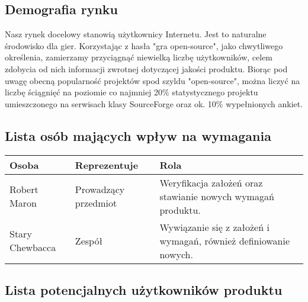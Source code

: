 \documentclass[12pt,a4paper,twoside]{article}
\begin{document}
\subsection{Demografia rynku}
Nasz rynek docelowy stanowią użytkownicy Internetu.
Jest to naturalne środowisko dla gier.
Korzystając z hasła "gra open-source", jako chwytliwego określenia, zamierzamy przyciągnąć niewielką liczbę użytkowników, celem zdobycia od nich informacji zwrotnej dotyczącej jakości produktu.
Biorąc pod uwagę obecną popularność projektów spod szyldu "open-source", można liczyć na liczbę ściągnięć na poziomie co najmniej 20\% statystycznego projektu umieszczonego na serwisach klasy SourceForge oraz ok. 10\% wypełnionych ankiet.






\subsection{Lista osób mających wpływ na wymagania}


\begin{longtable}{|p{1in}|p{2in}|p{2in}|}
\hline
{\bf Osoba} & {\bf Reprezentuje} & {\bf Rola}\\
\hline
\endhead
Robert Maron &
Prowadzący przedmiot &
Weryfikacja założeń oraz stawianie nowych wymagań produktu.\\
\hline
Stary Chewbacca &
Zespół &
Wywiązanie się z założeń i wymagań, również definiowanie nowych.\\
\hline
\end{longtable}

\subsection{Lista potencjalnych użytkowników produktu}
\end{document}
